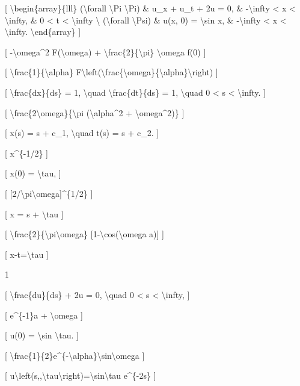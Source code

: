 \documentclass[
]{article}
\begin{document}
{[} \textbackslash begin\{array\}\{lll\} (\textbackslash forall
\textbackslash Pi \textbackslash Pi) \& u\_x + u\_t + 2u = 0, \&
-\textbackslash infty \textless{} x \textless{} \textbackslash infty, \&
0 \textless{} t \textless{} \textbackslash infty \textbackslash{}
(\textbackslash forall \textbackslash Psi) \& u(x, 0) =
\textbackslash sin x, \& -\textbackslash infty \textless{} x \textless{}
\textbackslash infty. \textbackslash end\{array\} {]}

{[} -\textbackslash omega\^{}2 F(\textbackslash omega) +
\textbackslash frac\{2\}\{\textbackslash pi\} \textbackslash omega f(0)
{]}

{[} \textbackslash frac\{1\}\{\textbackslash alpha\}
F\textbackslash left(\textbackslash frac\{\textbackslash omega\}\{\textbackslash alpha\}\textbackslash right)
{]}

{[} \textbackslash frac\{dx\}\{ds\} = 1, \textbackslash quad
\textbackslash frac\{dt\}\{ds\} = 1, \textbackslash quad 0 \textless{} s
\textless{} \textbackslash infty. {]}

{[} \textbackslash frac\{2\textbackslash omega\}\{\textbackslash pi
(\textbackslash alpha\^{}2 + \textbackslash omega\^{}2)\} {]}

{[} x(s) = s + c\_1, \textbackslash quad t(s) = s + c\_2. {]}

{[} x\^{}\{-1/2\} {]}

{[} x(0) = \textbackslash tau, {]}

{[} {[}2/\textbackslash pi\textbackslash omega{]}\^{}\{1/2\} {]}

{[} x = s + \textbackslash tau {]}

{[} \textbackslash frac\{2\}\{\textbackslash pi\textbackslash omega\}
{[}1-\textbackslash cos(\textbackslash omega a){]} {]}

{[} x-t=\textbackslash tau {]}

1

{[} \textbackslash frac\{du\}\{ds\} + 2u = 0, \textbackslash quad 0
\textless{} s \textless{} \textbackslash infty, {]}

{[} e\^{}\{-1\}a + \textbackslash omega {]}

{[} u(0) = \textbackslash sin \textbackslash tau. {]}

{[}
\textbackslash frac\{1\}\{2\}e\^{}\{-\textbackslash alpha\}\textbackslash sin\textbackslash omega
{]}

{[}
u\textbackslash left(s,,\textbackslash tau\textbackslash right)=\textbackslash sin\textbackslash tau
e\^{}\{-2s\} {]}
\end{document}
